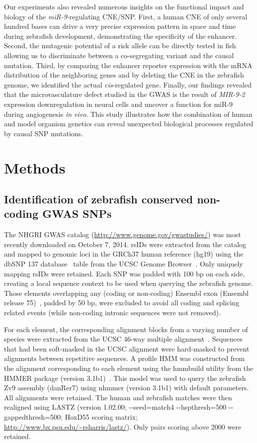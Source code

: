 Our experiments also revealed numerous insights on the functional impact
and biology of the \emph{miR-9-}regulating CNE/SNP. First, a human CNE
of only several hundred bases can drive a very precise expression
pattern in space and time during zebrafish development, demonstrating
the specificity of the enhancer. Second, the mutagenic potential of a
risk allele can be directly tested in fish allowing us to discriminate
between a co-segregating variant and the causal mutation. Third, by
comparing the enhancer reporter expression with the mRNA distribution of
the neighboring genes and by deleting the CNE in the zebrafish genome,
we identified the actual \emph{cis}-regulated gene. Finally, our
findings revealed that the microvasculature defect studied in the GWAS
is the result of \emph{MIR-9-2} expression downregulation in neural
cells and uncover a function for miR-9 during angiogenesis \emph{in
vivo}. This study illustrates how the combination of human and model
organism genetics can reveal unexpected biological processes regulated
by causal SNP mutations.

\section{Methods}
\label{sec:zfishSnpsMethods}

\subsection{Identification of zebrafish conserved non-coding GWAS
SNPs}

The NHGRI GWAS catalog (\url{http://www.genome.gov/gwastudies/}) was most
recently downloaded on October 7, 2014. rsIDs were extracted from the
catalog and mapped to genomic loci in the GRCh37 human reference (hg19)
using the dbSNP 137 database~\citep{Sherry:2001tj} table from the UCSC Genome Browser~\citep{Karolchik:2014eu}. Only uniquely
mapping rsIDs were retained. Each SNP was padded with 100 bp on each
side, creating a local sequence context to be used when querying the
zebrafish genome. Those elements overlapping any (coding or non-coding)
Ensembl exon (Ensembl release 75)~\citep{Flicek:2014cy}, padded by 50 bp, were excluded to avoid all coding and
splicing related events (while non-coding intronic sequences were not
removed).

For each element, the corresponding alignment blocks from a varying
number of species were extracted from the UCSC 46-way multiple alignment~\citep{Karolchik:2014eu}. Sequences that
had been soft-masked in the UCSC alignment were hard-masked to prevent
alignments between repetitive sequences. A profile HMM was constructed
from the alignment corresponding to each element using the hmmbuild
utility from the HMMER package (version 3.1b1)~\citep{Wheeler:2013gj}. This model was
used to query the zebrafish Zv9 assembly (danRer7) using nhmmer (version
3.1b1) with default parameters. All alignments were retained. The human
and zebrafish matches were then realigned using LASTZ (version 1.02.00;
-\/-seed=match4 -\/-hspthresh=500 -\/-gappedthresh=500; HoxD55 scoring
matrix; \url{http://www.bx.psu.edu/~rsharris/lastz/}). Only pairs
scoring above 2000 were retained.

